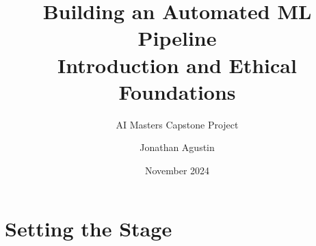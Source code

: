 \documentclass[aspectratio=169]{beamer}
\title{Building an Automated ML Pipeline \\ \large Introduction and Ethical Foundations}
\subtitle{AI Masters Capstone Project}
\author{Jonathan Agustin}
\date{November 2024}
\begin{document}
\maketitle

\section{Setting the Stage}
\end{document}
